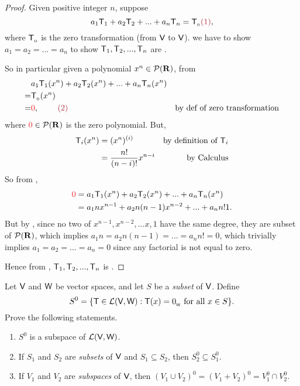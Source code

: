 \begin{proof}
Given positive integer \(n\), suppose
\[
    a_1\T_1 + a_2\T_2 + ... + a_n\T_n = \TZERO \MAROON{(1)},
\]
where \(\textsf{T}_{_0}\) is the zero transformation (from \(\textsf{V}\) to \(\textsf{V}\)).
we have to show \(a_1 = a_2 = ... = a_n\) to show \(\textsf{T}_1, \textsf{T}_2, ..., \textsf{T}_n\) are \LID{}.

So in particular given a polynomial \(x^n \in \mathcal{P}(\mathbf{R})\), from 
\begin{align*}
      & a_1 \T_1(x^n) + a_2 \T_2(x^n) + ... + a_n \T_n(x^n) \\
    = & \TZERO(x^n) \\
    = & \RED{0}, \MAROON{\ \ \ \ \ \ \ (2)} & \text{by def of zero transformation}
\end{align*}
where \(\RED{0} \in \mathcal{P}(\SET{R})\) is the zero polynomial.
But,
\begin{align*}
    \textsf{T}_i(x^n) & = (x^n)^{(i)} & \text{by definition of \(\textsf{T}_i\)} \\
              & = \frac{n!}{(n-i)!}x^{n - i} & \text{by Calculus}
\end{align*}
So from ,
\begin{align*}
    \RED{0} & = a_1 \T_1(x^n) + a_2 \T_2(x^n) + ... + a_n \T_n(x^n) \\
            & = a_1 n x^{n - 1} + a_2 n(n-1) x^{n - 2} + ... + a_n n! 1.
\end{align*}
But by , since no two of \(x^{n - 1}, x^{n - 2}, ... x, 1\) have the same degree, they are \LID{} subset of \(\mathcal{P}(\mathbf{R})\),
which implies \(a_1 n = a_2 n(n - 1) = ... = a_n n! = 0\),
which trivially implies \(a_1 = a_2 = ... = a_n = 0\) since any factorial is not equal to zero.

Hence from , \(\textsf{T}_1, \textsf{T}_2, ..., \textsf{T}_n\) is \LID{}.
\end{proof}

\begin{exercise} \label{exercise 2.2.16}
Let \(\textsf{V}\) and \(\textsf{W}\) be vector spaces, and let \(S\) be a \emph{subset} of \(\textsf{V}\).
Define
\[
    S^0 = \{ \textsf{T} \in \mathcal{L}(\textsf{V}, \textsf{W}) : \textsf{T}(x) = 0_{_{\textsf{W}}} \text{ for all } x \in S \}.
\]
Prove the following statements.
\begin{enumerate}
\item \(S^0\) is a subspace of \(\mathcal{L}(\textsf{V}, \textsf{W})\).
\item If \(S_1\) and \(S_2\) are \emph{subsets} of \(\textsf{V}\) and \(S_1 \subseteq S_2\), then \(S_2^0 \subseteq S_1^0\).
\item If \(V_1\) and \(V_2\) are \emph{subspaces} of \(\textsf{V}\), then \((V_1 \cup V_2)^0 = (V_1 + V_2)^0 = V_1^0 \cap V_2^0\).
\end{enumerate}
\end{exercise}


